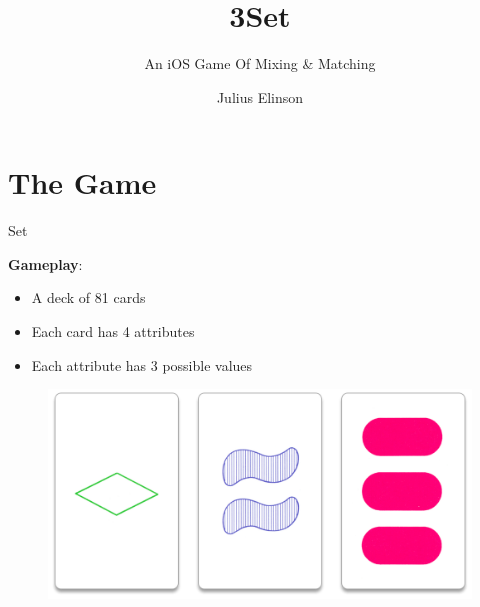\documentclass{beamer}
\author{Julius Elinson}
\title{3Set}
\subtitle{An iOS Game Of Mixing \& Matching}
\institute{Aquincum Institute of Technology\\Harvey Mudd College}
\begin{document}
{
\begin{frame}
\maketitle
\end{frame}
}


\section{The Game}
\begin{frame}[t]{Set}

\textbf{Gameplay}:
\begin{itemize}
 \item A deck of 81 cards
 \item Each card has 4 attributes
 \item Each attribute has 3 possible values
\end{itemize}
\pause


\begin{figure}
\centering 
\includegraphics[width=.5\paperwidth]{img/triplet.png}
\end{figure}
\end{frame}
\end{document}
